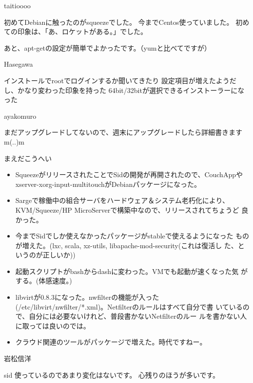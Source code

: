 \begin{prework}{ taitioooo }

初めてDebianに触ったのがsqueezeでした。
今までCentos使っていました。
初めての印象は、「あ、ロケットがある。」でした。

あと、apt-getの設定が簡単でよかったです。（yumと比べてですが）
\end{prework}

\begin{prework}{ Hasegawa }

インストールでrootでログインするか聞いてきたり
設定項目が増えたようだし、かなり変わった印象を持った
64bit/32bitが選択できるインストーラーになった

\end{prework}

\begin{prework}{ ayakomuro }

まだアップグレードしてないので、週末にアップグレードしたら詳細書きますm(..)m
\end{prework}

\begin{prework}{ まえだこうへい }

\begin{itemize}
 \item SqueezeがリリースされたことでSidの開発が再開されたので、CouchAppや
       xserver-xorg-input-multitouchがDebianパッケージになった。
 \item Sargeで稼働中の組合サーバをハードウェア＆システム老朽化により、
       KVM/Squeeze/HP MicroServerで構築中なので、リリースされてちょうど
       良かった。
 \item 今までSidでしか使えなかったパッケージがstableで使えるようになった
       ものが増えた。(lxc, scala, xz-utils, libapache-mod-security(これは復活し
       た、というのが正しいか))
 \item 起動スクリプトがbashからdashに変わった。VMでも起動が速くなった気
       がする。(体感速度。)
\end{itemize}
\begin{itemize}
 \item libvirtが0.8.3になった。nwfilterの機能が入った
       (/etc/libvirt/nwfilter/*.xml)。Netfilterのルールはすべて自分で書
       いているので、自分には必要ないけれど、普段書かないNetfilterのルー
       ルを書かない人に取っては良いのでは。
 \item クラウド関連のツールがパッケージで増えた。時代ですねー。
\end{itemize}
\end{prework}

\begin{prework}{ 岩松信洋 }

sid 使っているのであまり変化はないです。
心残りのほうが多いです。
\end{prework}


